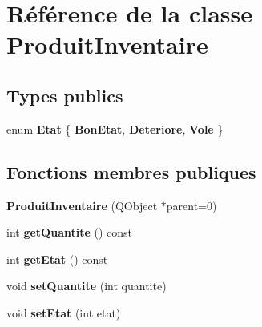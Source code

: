 \hypertarget{class_produit_inventaire}{
\section{Référence de la classe ProduitInventaire}
\label{d2/d66/class_produit_inventaire}
}
\subsection*{Types publics}
\begin{DoxyCompactItemize}
\item 
enum {\bfseries Etat} \{ {\bfseries BonEtat}, 
{\bfseries Deteriore}, 
{\bfseries Vole}
 \}
\end{DoxyCompactItemize}
\subsection*{Fonctions membres publiques}
\begin{DoxyCompactItemize}
\item 
\hypertarget{class_produit_inventaire_a11acef1e64475b073f9e6470a741fb36}{
{\bfseries ProduitInventaire} (QObject $\ast$parent=0)}
\label{d2/d66/class_produit_inventaire_a11acef1e64475b073f9e6470a741fb36}

\item 
\hypertarget{class_produit_inventaire_a0ccf9d4d6809dadd801381af484b408c}{
int {\bfseries getQuantite} () const }
\label{d2/d66/class_produit_inventaire_a0ccf9d4d6809dadd801381af484b408c}

\item 
\hypertarget{class_produit_inventaire_a3882ff83f08c706cdc84003b3c0ae6e6}{
int {\bfseries getEtat} () const }
\label{d2/d66/class_produit_inventaire_a3882ff83f08c706cdc84003b3c0ae6e6}

\item 
\hypertarget{class_produit_inventaire_a99c8884b501c238e2fee2c72edffa0f3}{
void {\bfseries setQuantite} (int quantite)}
\label{d2/d66/class_produit_inventaire_a99c8884b501c238e2fee2c72edffa0f3}

\item 
\hypertarget{class_produit_inventaire_a9bdff5921126b87e78ca8dfe9701d28f}{
void {\bfseries setEtat} (int etat)}
\label{d2/d66/class_produit_inventaire_a9bdff5921126b87e78ca8dfe9701d28f}

\end{DoxyCompactItemize}
